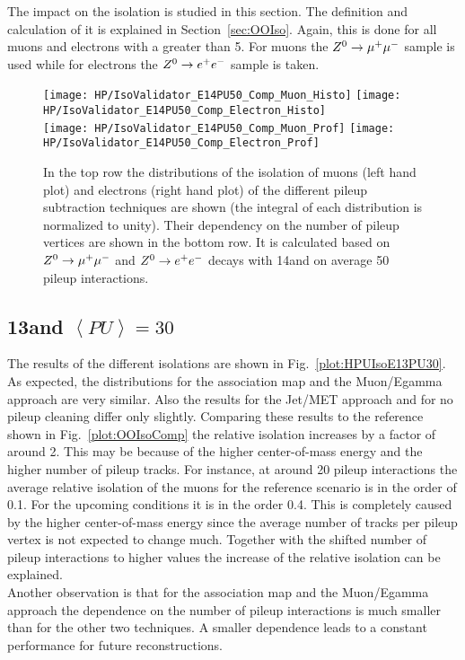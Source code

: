 The impact on the isolation is studied in this section. The definition and calculation of it is explained in Section~\ref{sec:OOIso}. Again, this is done for all muons and electrons with a \pt greater than 5\GeV. For muons the ${Z^{0}}\rightarrow\mu^+\mu^-$ sample is used while for electrons the ${Z^{0}}\rightarrow e^+e^-$ sample is taken.

\begin{figure}[Hb]
    \centering
    \texttt{[image: HP/IsoValidator\_E14PU50\_Comp\_Muon\_Histo]}
    \texttt{[image: HP/IsoValidator\_E14PU50\_Comp\_Electron\_Histo]}
    \\
    \texttt{[image: HP/IsoValidator\_E14PU50\_Comp\_Muon\_Prof]}
    \texttt{[image: HP/IsoValidator\_E14PU50\_Comp\_Electron\_Prof]}
    \caption[Distribution of the isolation of muons and electrons and their dependence on the number of pileup vertices for events with 14\TeV and $\left<PU\right>=50$]{In the top row the distributions of the isolation of muons (left hand plot) and electrons (right hand plot) of the different pileup subtraction techniques are shown (the integral of each distribution is normalized to unity). Their dependency on the number of pileup vertices are shown in the bottom row. It is calculated based on ${Z^{0}}\rightarrow\mu^+\mu^-$ and ${Z^{0}}\rightarrow e^+e^-$ decays with 14\TeV and on average 50 pileup interactions.\label{plot:HPUIsoE14PU50}}
\end{figure}

\subsection{13\TeV and $\left<PU\right>=30$ \label{sec:HPUIsoE13PU30}}

The results of the different isolations are shown in Fig.~\ref{plot:HPUIsoE13PU30}. As expected, the distributions for the association map and the Muon/Egamma approach are very similar. Also the results for the Jet/MET approach and for no pileup cleaning differ only slightly. Comparing these results to the reference shown in Fig.~\ref{plot:OOIsoComp}  the relative isolation increases by a factor of around 2. This may be because of the higher center-of-mass energy and the higher number of pileup tracks. For instance, at around 20 pileup interactions the average relative isolation of the muons for the reference scenario is in the order of 0.1. For the upcoming conditions it is in the order 0.4. This is completely caused by the higher center-of-mass energy since the average number of tracks per pileup vertex is not expected to change much. Together with the shifted number of pileup interactions to higher values the increase of the relative isolation can be explained. \\
Another observation is that for the association map and the Muon/Egamma approach the dependence on the number of pileup interactions is much smaller than for the other two techniques. A smaller dependence leads to a constant performance for future reconstructions.

